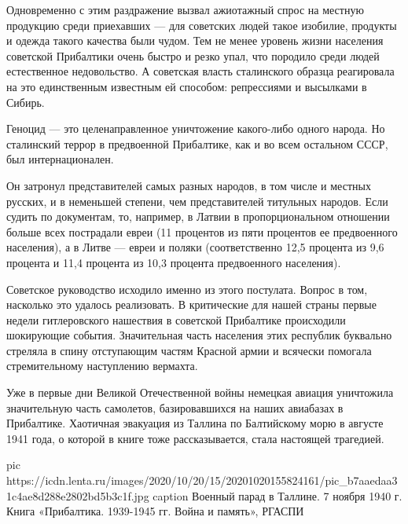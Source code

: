 Одновременно с этим раздражение вызвал ажиотажный спрос на местную продукцию
среди приехавших — для советских людей такое изобилие, продукты и одежда такого
качества были чудом. Тем не менее уровень жизни населения советской Прибалтики
очень быстро и резко упал, что породило среди людей естественное недовольство.
А советская власть сталинского образца реагировала на это единственным
известным ей способом: репрессиями и высылками в Сибирь.


Геноцид — это целенаправленное уничтожение какого-либо одного народа. Но
сталинский террор в предвоенной Прибалтике, как и во всем остальном СССР, был
интернационален.

Он затронул представителей самых разных народов, в том числе и местных русских,
и в неменьшей степени, чем представителей титульных народов. Если судить по
документам, то, например, в Латвии в пропорциональном отношении больше всех
пострадали евреи (11 процентов из пяти процентов ее предвоенного населения), а
в Литве — евреи и поляки (соответственно 12,5 процента из 9,6 процента и 11,4
процента из 10,3 процента предвоенного населения).


Советское руководство исходило именно из этого постулата. Вопрос в том,
насколько это удалось реализовать. В критические для нашей страны первые недели
гитлеровского нашествия в советской Прибалтике происходили шокирующие события.
Значительная часть населения этих республик буквально стреляла в спину
отступающим частям Красной армии и всячески помогала стремительному наступлению
вермахта.

Уже в первые дни Великой Отечественной войны немецкая авиация уничтожила
значительную часть самолетов, базировавшихся на наших авиабазах в Прибалтике.
Хаотичная эвакуация из Таллина по Балтийскому морю в августе 1941 года, о
которой в книге тоже рассказывается, стала настоящей трагедией.

\ifcmt
pic https://icdn.lenta.ru/images/2020/10/20/15/20201020155824161/pic_b7aaedaa31c4ae8d288e2802bd5b3c1f.jpg
caption Военный парад в Таллине. 7 ноября 1940 г.  Книга «Прибалтика. 1939-1945 гг. Война и память», РГАСПИ
\fi
